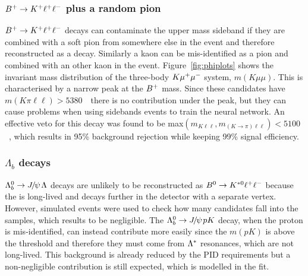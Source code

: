\subsubsection{${{B}^+} \rightarrow K^+ \ell^+ \ell^-$ plus a random pion}

${{B}^+} \rightarrow K^+ \ell^+ \ell^-$ decays can contaminate the upper \Bz mass sideband if they are combined
with a soft pion from somewhere else in the event and therefore reconstructed as a \Bz decay.
Similarly a kaon can be mis-identified as a pion and combined with an other kaon in the event.
Figure~\ref{fig:phiplots} shows the invariant mass distribution of the three-body $K{\mu^+\mu^-}$ system,
$m(K\mu\mu)$. This is characterised by a narrow peak at the ${{B}^+}$ mass. Since these
candidates have $m(K\pi\ell\ell) > 5380$~\mevcc~there is no contribution under the \Bz peak,
but they can cause problems when using sidebands events to train the neural network.
An effective veto for this decay was found to be max$(m_{K\ell\ell},m_{(K\to\pi)\ell\ell}) < 5100$~\mevcc,
which results in 95\% background rejection while keeping 99\% signal efficiency.

\subsubsection{$\Lambda_b$ decays}

$\Lb\to\jpsi\Lz$ decays are unlikely to be reconstructed as ${{B}^0} \rightarrow {\ensuremath{{K}^{*0}}} \ell^+ \ell^-$ because
the \Lz is long-lived and decays further in the detector with a separate vertex.
However, simulated events were used to check how many candidates fall into the \Bz samples, which results to be negligible. 
The $\Lb\to\jpsi pK$ decay, when the proton is mis-identified, can instead contribute more easily since the $m(pK)$ is above the \Lz threshold
and therefore they must come from ${\Lambda}^*$ resonances, which are not long-lived. This background is already
reduced by the PID requirements but a non-negligible contribution is still expected, 
which is modelled in the fit.


